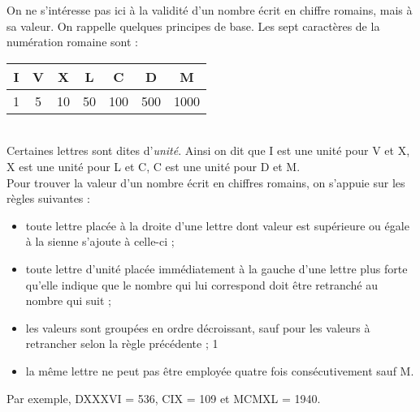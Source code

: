 \exer{}
\setcounter{numques}{0}

On ne s'intéresse pas ici à la validité d'un nombre écrit en chiffre romains, mais à sa valeur. On rappelle
quelques principes de base. Les sept caractères de la numération romaine sont :\\

\begin{tabular}{|c|c|c|c|c|c|c|}
 \hline
 I&V&X&L&C&D&M\\ \hline
 1&5&10&50&100&500&1000\\ \hline
\end{tabular}\\

Certaines lettres sont dites d'\emph{unité}. Ainsi on dit que I est une unité pour V et X, X est une 
unité pour L et C, C est une unité pour D et M.\\

Pour trouver la valeur d'un nombre écrit en chiffres romains, on s'appuie sur les règles suivantes :
\begin{itemize}
\item toute lettre placée à la droite d'une lettre dont valeur est supérieure ou égale à la sienne s'ajoute
à celle-ci ;
\item toute lettre d'unité placée immédiatement à la gauche d'une lettre plus forte qu'elle indique que
le nombre qui lui correspond doit être retranché au nombre qui suit ;
\item les valeurs sont groupées en ordre décroissant, sauf pour les valeurs à retrancher selon la règle
précédente ;
1
\item la même lettre ne peut pas être employée quatre fois consécutivement sauf M.
\end{itemize}

Par exemple,  DXXXVI = 536, CIX = 109 et MCMXL = 1940.

